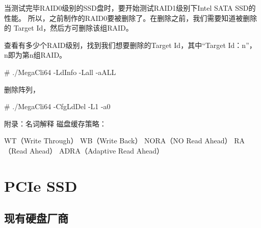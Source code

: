 当测试完毕RAID0级别的SSD盘时，要开始测试RAID1级别下Intel SATA SSD的性能。
所以，之前制作的RAID0要被删除了。在删除之前，我们需要知道被删除的
Target Id，然后方可删除该组RAID。

查看有多少个RAID级别，找到我们想要删除的Target Id，其中“Target Id：n”，
n即为第n组RAID。

\begin{code}
# ./MegaCli64 -LdInfo -Lall -aALL 
\end{code}

删除阵列，
\begin{code}
# ./MegaCli64 -CfgLdDel -L1 -a0
\end{code}
	
附录：名词解释
磁盘缓存策略：
\begin{code}
WT（Write Through）
WB（Write Back）
NORA（NO Read Ahead）
RA（Read Ahead）
ADRA（Adaptive Read Ahead）
\end{code}

\chapter{PCIe SSD}

\section{现有硬盘厂商}


